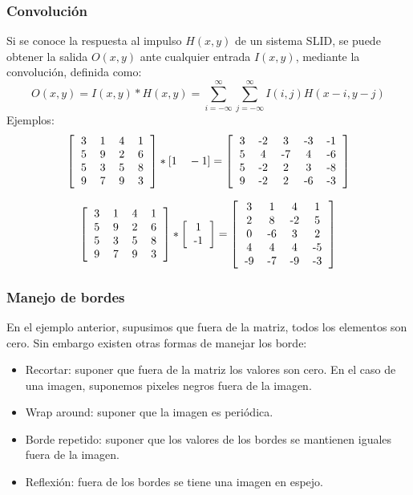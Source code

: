 \begin{frame}\frametitle{Convolución}
  Si se conoce la respuesta al impulso $H(x,y)$ de un sistema SLID, se puede obtener la salida $O(x,y)$ ante cualquier entrada $I(x,y)$, mediante la convolución, definida como:
  \[O(x,y) = I(x,y)*H(x,y) = \sum_{i=-\infty}^\infty \sum_{j=-\infty}^\infty I(i,j)H(x-i, y-j)\]
  Ejemplos:
  \[\left[\begin{tabular}{cccc}
      3 & 1 & 4 & 1\\
      5 & 9 & 2 & 6\\
      5 & 3 & 5 & 8\\
      9 & 7 & 9 &3
    \end{tabular}\right]* [1\quad -1] =
  \left[\begin{tabular}{ccccc}
      3 & -2 & 3 & -3 & -1\\
      5 & 4 & -7 & 4 & -6\\
      5 & -2 & 2 & 3 & -8\\
      9 & -2 & 2 & -6 & -3
    \end{tabular}\right]\]

  \[\left[\begin{tabular}{cccc}
      3 & 1 & 4 & 1\\
      5 & 9 & 2 & 6\\
      5 & 3 & 5 & 8\\
      9 & 7 & 9 &3
    \end{tabular}\right]* \left[\begin{tabular}{c}1 \\ -1\end{tabular}\right] =
  \left[\begin{tabular}{cccc}
      3 & 1 & 4 & 1\\
      2 & 8 & -2 & 5\\
      0 & -6 & 3 & 2\\
      4 & 4 & 4 & -5\\
      -9 & -7 & -9 & -3
    \end{tabular}\right]\]
\end{frame}

\begin{frame}\frametitle{Manejo de bordes}
  En el ejemplo anterior, supusimos que fuera de la matriz, todos los elementos son cero. Sin embargo existen otras formas de manejar los borde:
  \begin{itemize}
  \item Recortar: suponer que fuera de la matriz los valores son cero. En el caso de una imagen, suponemos pixeles negros fuera de la imagen.
  \item Wrap around: suponer que la imagen es periódica.
  \item Borde repetido: suponer que los valores de los bordes se mantienen iguales fuera de la imagen.
  \item Reflexión: fuera de los bordes se tiene una imagen en espejo.
  \end{itemize}
\end{frame}

